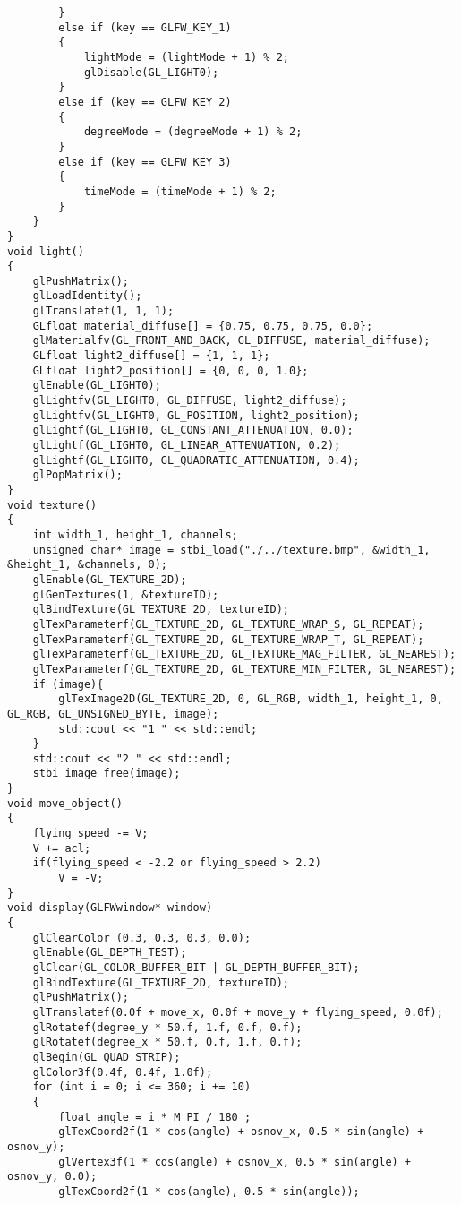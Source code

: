 \documentclass[a4paper, 14pt]{extarticle}
\begin{document}
\begin{verbatim}
        }
        else if (key == GLFW_KEY_1)
        {
            lightMode = (lightMode + 1) % 2;
            glDisable(GL_LIGHT0);
        }
        else if (key == GLFW_KEY_2)
        {
            degreeMode = (degreeMode + 1) % 2;
        }
        else if (key == GLFW_KEY_3)
        {
            timeMode = (timeMode + 1) % 2;
        }
    }
}
void light()
{
    glPushMatrix();
    glLoadIdentity();
    glTranslatef(1, 1, 1);
    GLfloat material_diffuse[] = {0.75, 0.75, 0.75, 0.0};
    glMaterialfv(GL_FRONT_AND_BACK, GL_DIFFUSE, material_diffuse);
    GLfloat light2_diffuse[] = {1, 1, 1};
    GLfloat light2_position[] = {0, 0, 0, 1.0};
    glEnable(GL_LIGHT0);
    glLightfv(GL_LIGHT0, GL_DIFFUSE, light2_diffuse);
    glLightfv(GL_LIGHT0, GL_POSITION, light2_position);
    glLightf(GL_LIGHT0, GL_CONSTANT_ATTENUATION, 0.0);
    glLightf(GL_LIGHT0, GL_LINEAR_ATTENUATION, 0.2);
    glLightf(GL_LIGHT0, GL_QUADRATIC_ATTENUATION, 0.4);
    glPopMatrix();
}
void texture()
{
    int width_1, height_1, channels;
    unsigned char* image = stbi_load("./../texture.bmp", &width_1, &height_1, &channels, 0);
    glEnable(GL_TEXTURE_2D);
    glGenTextures(1, &textureID);
    glBindTexture(GL_TEXTURE_2D, textureID);
    glTexParameterf(GL_TEXTURE_2D, GL_TEXTURE_WRAP_S, GL_REPEAT);
    glTexParameterf(GL_TEXTURE_2D, GL_TEXTURE_WRAP_T, GL_REPEAT);
    glTexParameterf(GL_TEXTURE_2D, GL_TEXTURE_MAG_FILTER, GL_NEAREST);
    glTexParameterf(GL_TEXTURE_2D, GL_TEXTURE_MIN_FILTER, GL_NEAREST);
    if (image){
        glTexImage2D(GL_TEXTURE_2D, 0, GL_RGB, width_1, height_1, 0, GL_RGB, GL_UNSIGNED_BYTE, image);
        std::cout << "1 " << std::endl;
    }
    std::cout << "2 " << std::endl;
    stbi_image_free(image);
}
void move_object()
{
    flying_speed -= V;
    V += acl;
    if(flying_speed < -2.2 or flying_speed > 2.2)
        V = -V;
}
void display(GLFWwindow* window)
{
    glClearColor (0.3, 0.3, 0.3, 0.0);
    glEnable(GL_DEPTH_TEST);
    glClear(GL_COLOR_BUFFER_BIT | GL_DEPTH_BUFFER_BIT);
    glBindTexture(GL_TEXTURE_2D, textureID);
    glPushMatrix();
    glTranslatef(0.0f + move_x, 0.0f + move_y + flying_speed, 0.0f);
    glRotatef(degree_y * 50.f, 1.f, 0.f, 0.f);
    glRotatef(degree_x * 50.f, 0.f, 1.f, 0.f);
    glBegin(GL_QUAD_STRIP);
    glColor3f(0.4f, 0.4f, 1.0f);
    for (int i = 0; i <= 360; i += 10)
    {
        float angle = i * M_PI / 180 ;
        glTexCoord2f(1 * cos(angle) + osnov_x, 0.5 * sin(angle) + osnov_y);
        glVertex3f(1 * cos(angle) + osnov_x, 0.5 * sin(angle) + osnov_y, 0.0);
        glTexCoord2f(1 * cos(angle), 0.5 * sin(angle));

\end{verbatim}
\end{document}
